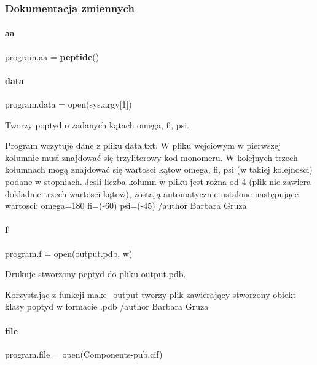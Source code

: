 \subsubsection{Dokumentacja zmiennych}
\mbox{\label{namespaceprogram_aaac913534cc4f0ac2d38962f6f53f81c}} 
\paragraph{aa}
{\footnotesize\ttfamily program.\+aa = \textbf{ peptide}()}

\mbox{\label{namespaceprogram_a044b3e27d1a91ad8a3a66ac4f32668f1}} 
\paragraph{data}
{\footnotesize\ttfamily program.\+data = open(sys.\+argv[1])}



Tworzy poptyd o zadanych kątach omega, fi, psi. 

Program wczytuje dane z pliku data.\+txt. W pliku wejciowym w pierwszej kolumnie musi znajdować się trzyliterowy kod monomeru. W kolejnych trzech kolumnach mogą znajdować się wartosci kątow omega, fi, psi (w takiej kolejnosci) podane w stopniach. Jesli liczba kolumn w pliku jest rożna od 4 (plik nie zawiera dokladnie trzech wartosci kątow), zostają automatycznie ustalone następujące wartosci\+: omega=180 fi=(-\/60) psi=(-\/45) /author Barbara Gruza \mbox{\label{namespaceprogram_af3cf1336dd6b364a2186dd146e846a4a}} 
\paragraph{f}
{\footnotesize\ttfamily program.\+f = open(\textquotesingle{}output.\+pdb\textquotesingle{}, \textquotesingle{}w\textquotesingle{})}



Drukuje stworzony peptyd do pliku output.\+pdb. 

Korzystając z funkcji make\+\_\+output tworzy plik zawierający stworzony obiekt klasy poptyd w formacie .pdb /author Barbara Gruza \mbox{\label{namespaceprogram_a8e2fe534c74d569fa181e0f2a6ff6440}} 
\paragraph{file}
{\footnotesize\ttfamily program.\+file = open(\textquotesingle{}Components-\/pub.\+cif\textquotesingle{})}



